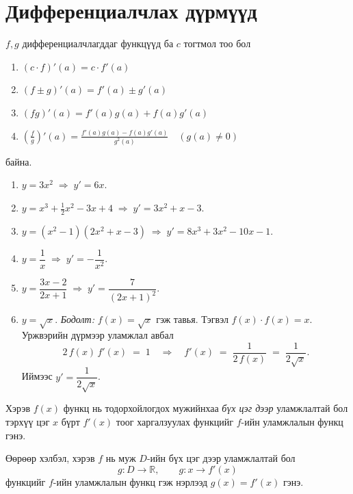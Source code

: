 \section{Дифференциалчлах дүрмүүд}

\begin{theorem}
$f,g$ дифференциалчлагддаг функцүүд ба  $c$ тогтмол тоо бол
\begin{enumerate}
    \item $(c\cdot f)'(a)=c\cdot f'(a)$
    \item $(f\pm g)'(a)=f'(a)\pm g'(a)$
    \item $(fg)'(a)=f'(a)g(a)+f(a)g'(a)$
    \item $
\left(\frac{f}{g}\right)'(a)=\frac{f'(a)g(a) - f(a)g'(a)}{g^2(a)}\quad (g(a)\ne 0)$
\end{enumerate}
байна.
\end{theorem}

\begin{example}
\begin{enumerate}
  \item $y=3x^2 \;\Rightarrow\; y'=6x$.
  \item $y=x^3+\tfrac12x^2-3x+4 \;\Rightarrow\; y'=3x^2+x-3$.
  \item $y=(x^2-1)(2x^2+x-3) \;\Rightarrow\; y'=8x^3+3x^2-10x-1$.
  \item $y=\dfrac{1}{x} \;\Rightarrow\; y'= -\dfrac{1}{x^{2}}$.
  \item $y=\dfrac{3x-2}{2x+1} \;\Rightarrow\; y'=\dfrac{7}{(2x+1)^2}$.
  \item $y=\sqrt{x}$. \textit{Бодолт:} $f(x)=\sqrt{x}$ гэж тавья. Тэгвэл
        $f(x)\cdot f(x)=x$. Уржвэрийн дүрмээр уламжлал авбал
        \[
           2\,f(x)\,f'(x) \;=\; 1
           \quad\Longrightarrow\quad
           f'(x) \;=\; \frac{1}{2\,f(x)} \;=\; \frac{1}{2\sqrt{x}}.
        \]
        Иймээс $y'=\dfrac{1}{2\sqrt{x}}$.
\end{enumerate}
\end{example}

\begin{definition}
Хэрэв $f(x)$ функц нь тодорхойлогдох мужийнхаа \emph{бүх цэг дээр} уламжлалтай бол 
тэрхүү цэг $x$ бүрт $f'(x)$ тоог харгалзуулах функцийг $f$-ийн уламжлалын функц гэнэ.  

Өөрөөр хэлбэл, хэрэв $f$ нь муж $D$-ийн бүх цэг дээр уламжлалтай бол  
\[
g:D\to\mathbb{R}, \qquad g: x\to f'(x)
\]
функцийг $f$-ийн уламжлалын функц гэж нэрлээд $g(x)=f'(x)$ гэнэ.
\end{definition}
